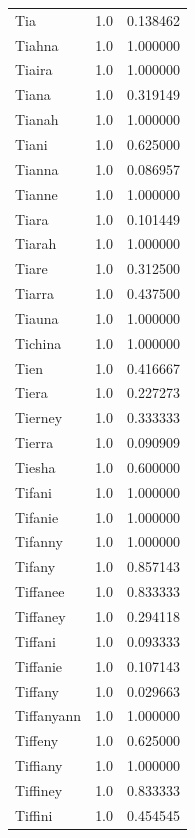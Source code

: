 \documentclass[
  letterpaper,
  DIV=11,
  numbers=noendperiod]{scrreprt}
\begin{document}
\begin{tabular}{lrr}
Tia             &   1.0 &   0.138462 \\
Tiahna          &   1.0 &   1.000000 \\
Tiaira          &   1.0 &   1.000000 \\
Tiana           &   1.0 &   0.319149 \\
Tianah          &   1.0 &   1.000000 \\
Tiani           &   1.0 &   0.625000 \\
Tianna          &   1.0 &   0.086957 \\
Tianne          &   1.0 &   1.000000 \\
Tiara           &   1.0 &   0.101449 \\
Tiarah          &   1.0 &   1.000000 \\
Tiare           &   1.0 &   0.312500 \\
Tiarra          &   1.0 &   0.437500 \\
Tiauna          &   1.0 &   1.000000 \\
Tichina         &   1.0 &   1.000000 \\
Tien            &   1.0 &   0.416667 \\
Tiera           &   1.0 &   0.227273 \\
Tierney         &   1.0 &   0.333333 \\
Tierra          &   1.0 &   0.090909 \\
Tiesha          &   1.0 &   0.600000 \\
Tifani          &   1.0 &   1.000000 \\
Tifanie         &   1.0 &   1.000000 \\
Tifanny         &   1.0 &   1.000000 \\
Tifany          &   1.0 &   0.857143 \\
Tiffanee        &   1.0 &   0.833333 \\
Tiffaney        &   1.0 &   0.294118 \\
Tiffani         &   1.0 &   0.093333 \\
Tiffanie        &   1.0 &   0.107143 \\
Tiffany         &   1.0 &   0.029663 \\
Tiffanyann      &   1.0 &   1.000000 \\
Tiffeny         &   1.0 &   0.625000 \\
Tiffiany        &   1.0 &   1.000000 \\
Tiffiney        &   1.0 &   0.833333 \\
Tiffini         &   1.0 &   0.454545 \\

\end{tabular}
\end{document}

